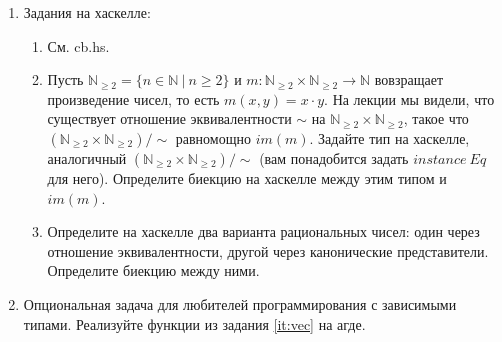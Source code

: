 \begin{enumerate}
\item Задания на хаскелле:
\begin{enumerate}
\item См. cb.hs.
\item Пусть $\mathbb{N}_{\geq 2} = \{ n \in \mathbb{N}\ |\ n \geq 2 \}$ и $m : \mathbb{N}_{\geq 2} \times \mathbb{N}_{\geq 2} \to \mathbb{N}$ вовзращает произведение чисел, то есть $m(x,y) = x \cdot y$.
    На лекции мы видели, что существует отношение эквивалентности $\sim$ на $\mathbb{N}_{\geq 2} \times \mathbb{N}_{\geq 2}$, такое что $(\mathbb{N}_{\geq 2} \times \mathbb{N}_{\geq 2})/\!\!\sim$ равномощно $im(m)$.
    Задайте тип на хаскелле, аналогичный $(\mathbb{N}_{\geq 2} \times \mathbb{N}_{\geq 2})/\!\!\sim$ (вам понадобится задать $instance\ Eq$ для него).
    Определите биекцию на хаскелле между этим типом и $im(m)$.
\item
{
    Определите на хаскелле два варианта рациональных чисел: один через отношение эквивалентности, другой через канонические представители.
}
    Определите биекцию между ними.
\end{enumerate}

\item Опциональная задача для любителей программирования с зависимыми типами. Реализуйте функции из задания \ref{it:vec} на агде.

\end{enumerate}


